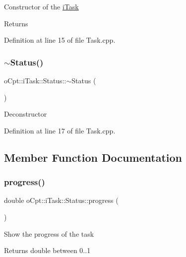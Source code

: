 Constructor of the \hyperlink{classo_cpt_1_1i_task}{i\+Task} \begin{DoxyReturn}{Returns}

\end{DoxyReturn}


Definition at line 15 of file Task.\+cpp.

\hypertarget{classo_cpt_1_1i_task_1_1_status_a80bab1abd55406ce11f5878c2bf5f500}{}\label{classo_cpt_1_1i_task_1_1_status_a80bab1abd55406ce11f5878c2bf5f500} 
\subsubsection{\texorpdfstring{$\sim$\+Status()}{~Status()}}
{\footnotesize\ttfamily o\+Cpt\+::i\+Task\+::\+Status\+::$\sim$\+Status (\begin{DoxyParamCaption}{ }\end{DoxyParamCaption})\hspace{0.3cm}{\ttfamily [virtual]}}

Deconstructor 

Definition at line 17 of file Task.\+cpp.



\subsection{Member Function Documentation}
\hypertarget{classo_cpt_1_1i_task_1_1_status_abc4f40acb0a7b5f73407cefb01187ae8}{}\label{classo_cpt_1_1i_task_1_1_status_abc4f40acb0a7b5f73407cefb01187ae8} 
\subsubsection{\texorpdfstring{progress()}{progress()}}
{\footnotesize\ttfamily double o\+Cpt\+::i\+Task\+::\+Status\+::progress (\begin{DoxyParamCaption}{ }\end{DoxyParamCaption})}

Show the progress of the task \begin{DoxyReturn}{Returns}
double between 0..1 
\end{DoxyReturn}


